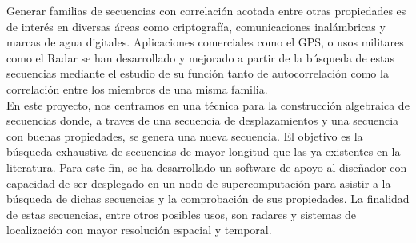 Generar familias de secuencias con correlación acotada entre otras
propiedades es de interés en diversas áreas como criptografía, comunicaciones
inalámbricas y marcas de agua digitales. Aplicaciones comerciales como el GPS,
o usos militares como el Radar se han desarrollado y mejorado  a partir de la
búsqueda de estas secuencias mediante el estudio de su función tanto de
autocorrelación como la correlación entre los miembros de una misma familia.\\

En este proyecto, nos centramos en una técnica para la
construcción algebraica de secuencias donde, a traves de una secuencia de
desplazamientos y una secuencia con buenas propiedades, se genera una nueva
secuencia. El objetivo es la búsqueda exhaustiva de secuencias de mayor
longitud que las ya existentes en la literatura. Para este fin, se ha
desarrollado un software de apoyo al diseñador con capacidad de ser desplegado
en un nodo de supercomputación para asistir a la búsqueda de dichas secuencias
y la comprobación de sus propiedades. La finalidad de estas secuencias, entre
otros posibles usos, son radares y sistemas de localización con mayor resolución
espacial y temporal.\\
